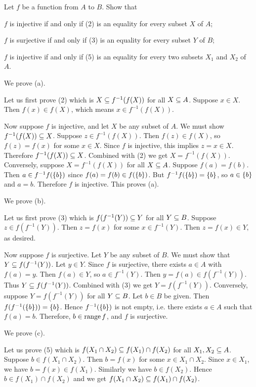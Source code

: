 \begin{exercise}
Let $f$ be a function from $A$ to $B$. Show that
\begin{enumalpha}
    \item $f$ is injective if and only if (2) is an equality for every subset $X$ of $A$;
    \item $f$ is surjective if and only if (3) is an equality for every subset $Y$ of $B$;
    \item $f$ is injective if and only if (5) is an equality for every two subsets $X_1$ and $X_2$ of $A$.
\end{enumalpha}
\end{exercise}

\begin{solution}
We prove (a).

Let us first prove (2) which is $X\subseteq f^{-1}(f(X))$ for all $X\subseteq A$.
Suppose $x\in X$. Then $f(x)\in f(X)$,
which means $x\in f^{-1}(f(X))$.

Now suppose $f$ is injective, and let $X$ be any subset of $A$. We must show $f^{-1}(f(X)) \subseteq X$.
Suppose $z\in f^{-1}(f(X))$. Then $f(z)\in f(X)$, so $f(z)=f(x)$ for some $x\in X$.
Since $f$ is injective, this implies $z=x\in X$. Therefore $f^{-1}(f(X)) \subseteq X$. Combined with (2)
we get $X = f^{-1}(f(X))$.
Conversely, suppose $X = f^{-1}(f(X))$ for all $X\subseteq A$. Suppose $f(a)=f(b)$.
Then $a\in f^{-1}f(\left\{b\right\})$ since $f(a)=f(b)\in f(\left\{b\right\})$.
But $f^{-1}f(\left\{b\right\})=\left\{b\right\}$, so $a\in\left\{b\right\}$ and $a=b$.
Therefore $f$ is injective. This proves (a).

We prove (b).

Let us first prove (3) which is $f(f^{-1}(Y))\subseteq Y$ for all $Y\subseteq B$.
Suppose $z\in f(f^{-1}(Y))$. Then $z=f(x)$ for some $x\in f^{-1}(Y)$.
Then $z=f(x)\in Y$, as desired.

Now suppose $f$ is surjective. Let $Y$ be any subset of $B$.
We must show that $Y\subseteq f(f^{-1}(Y))$. Let $y\in Y$.
Since $f$ is surjective, there exists $a\in A$ with $f(a)=y$.
Then $f(a)\in Y$, so $a\in f^{-1}(Y)$. Then $y=f(a)\in f(f^{-1}(Y))$.
Thus $Y\subseteq f(f^{-1}(Y))$. Combined with (3) we get $Y= f(f^{-1}(Y))$.
Conversely, suppose $Y= f(f^{-1}(Y))$ for all $Y\subseteq B$.
Let $b\in B$ be given. Then $f(f^{-1}(\left\{b\right\}))=\left\{b\right\}$.
Hence $f^{-1}(\left\{b\right\})$ is not empty, i.e. there exists $a\in A$ such that $f(a)=b$.
Therefore, $b\in\operatorname{range} f$, and $f$ is surjective.

We prove (c).

Let us prove (5) which is $f(X_1\cap X_2)\subseteq f(X_1)\cap f(X_2)$ for all $X_1,X_2\subseteq A$.
Suppose $b\in f(X_1\cap X_2)$. Then $b=f(x)$ for some $x\in X_1\cap X_2$.
Since $x\in X_1$, we have $b=f(x)\in f(X_1)$. Similarly we have $b\in f(X_2)$.
Hence $b\in f(X_1)\cap f(X_2)$ and we get $f(X_1\cap X_2)\subseteq f(X_1)\cap f(X_2)$.


\end{solution}
